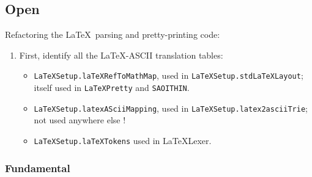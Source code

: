 


\subsection{Open}

Refactoring the \LaTeX\ parsing and pretty-printing code:
\begin{enumerate}
  \item
    First, identify all the \LaTeX-ASCII translation tables:
    \begin{itemize}
       \item
         \texttt{LaTeXSetup.laTeXRefToMathMap},
         used in \texttt{LaTeXSetup.stdLaTeXLayout};
         itself used in \texttt{LaTeXPretty} and \texttt{SAOITHIN}.
       \item
         \texttt{LaTeXSetup.latexASciiMapping},
         used in \texttt{LaTeXSetup.latex2asciiTrie};
         not used anywhere else !
       \item
         \texttt{LaTeXSetup.laTeXTokens}
         used in {LaTeXLexer}.
    \end{itemize}
\end{enumerate}


\subsubsection{Fundamental}

